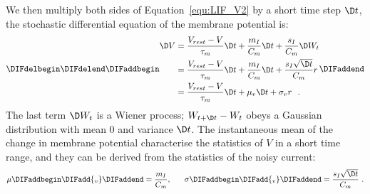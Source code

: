 	We then multiply both sides of Equation~\ref{equ:LIF_V2} by a short time step $\D t$, the stochastic differential equation of the membrane potential is: %
	\begin{equation}
	\DIFdelbegin %
\DIFdelend \DIFaddbegin \begin{aligned}
	\D V&= \frac{V_{rest} - V}{\tau_m }\D t + \frac{m_I}{C_m} \D t + \frac{s_I}{C_m}  \D W_t \\
	&=\frac{V_{rest} - V}{\tau_m }\D t + \frac{m_I}{C_m} \D t + \frac{s_I \sqrt{\D t}}{C_m} r  \\
	&=\frac{V_{rest} - V}{\tau_m }\D t + \mu_v \D t + \sigma_v r ~~. 
	\end{aligned}
	\DIFaddend \end{equation}	
	The last term $\D W_t$ is a Wiener process; $W_{t +\D t} - W_{t}$ obeys a Gaussian distribution with mean 0 and variance $\D t$\DIFaddbegin {}\DIFaddend .
	The instantaneous mean \DIFdelbegin {}\DIFdelend \DIFaddbegin {}\DIFaddend of the change in membrane potential characterise the statistics of $V$ in a short time range, and they can be derived from the statistics of the noisy current:
	\begin{equation}
	\mu\DIFaddbegin \DIFadd{_v }\DIFaddend =\dfrac{m_I}{C_m}, ~~~~~ \sigma\DIFaddbegin \DIFadd{_v }\DIFaddend = \dfrac{s_I \sqrt{\D t}}{C_m}~.
	\end{equation}
